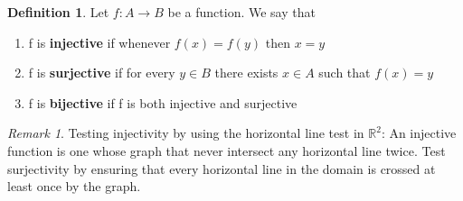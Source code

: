 \documentclass[11pt]{article}
\theoremstyle{plain}%
\theoremstyle{definition}
\newtheorem{defn}{Definition}[section]
\theoremstyle{remark}
\newtheorem*{rem}{Remark}
\newcommand{\R}{\mathbb{R}}
\begin{document}
\begin{defn}
  \label{jectivity}
  Let $f: A \to B$ be a function. We say that
  \begin{enumerate}
    \item f is \textbf{injective} if whenever $f(x) = f(y)$ then $x=y$
    \item f is \textbf{surjective} if for every $y\in B$ there exists $x\in A$ such that $f(x) = y$
    \item f is \textbf{bijective} if f is both injective and surjective
  \end{enumerate}

  \begin{rem}
    Testing injectivity by using the horizontal line test in $\R^2$: An injective function is one whose graph that never intersect any horizontal line twice. Test surjectivity by ensuring that every horizontal line in the domain is crossed at least once by the graph.
  \end{rem}
\end{defn}

\newpage
\end{document}
